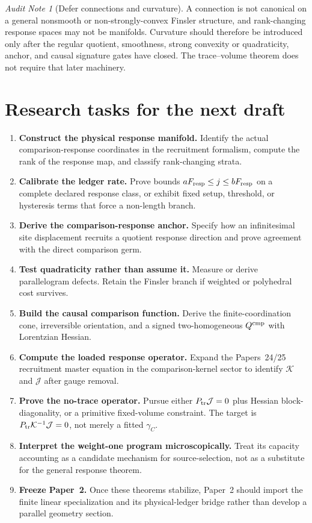 \documentclass[11pt]{article}
\theoremstyle{remark}
\newtheorem{audit}[theorem]{Audit Note}
\newcommand{\Fresp}{F_{\rm resp}}
\newcommand{\Qcmp}{Q^{\rm cmp}}
\newcommand{\Ptr}{P_{\rm tr}}
\begin{document}
\begin{audit}[Defer connections and curvature]
A connection is not canonical on a general nonsmooth or non-strongly-convex Finsler structure, and rank-changing response spaces may not be manifolds.  Curvature should therefore be introduced only after the regular quotient, smoothness, strong convexity or quadraticity, anchor, and causal signature gates have closed.  The trace--volume theorem does not require that later machinery.
\end{audit}

\section{Research tasks for the next draft}

\begin{enumerate}
\item \textbf{Construct the physical response manifold.}  Identify the actual comparison-response coordinates in the recruitment formalism, compute the rank of the response map, and classify rank-changing strata.
\item \textbf{Calibrate the ledger rate.}  Prove bounds $a\Fresp\le j\le b\Fresp$ on a complete declared response class, or exhibit fixed setup, threshold, or hysteresis terms that force a non-length branch.
\item \textbf{Derive the comparison-response anchor.}  Specify how an infinitesimal site displacement recruits a quotient response direction and prove agreement with the direct comparison germ.
\item \textbf{Test quadraticity rather than assume it.}  Measure or derive parallelogram defects.  Retain the Finsler branch if weighted or polyhedral cost survives.
\item \textbf{Build the causal comparison function.}  Derive the finite-coordination cone, irreversible orientation, and a signed two-homogeneous $\Qcmp$ with Lorentzian Hessian.
\item \textbf{Compute the loaded response operator.}  Expand the Papers~24/25 recruitment master equation in the comparison-kernel sector to identify $\mathcal K$ and $\mathcal J$ after gauge removal.
\item \textbf{Prove the no-trace operator.}  Pursue either $\Ptr\mathcal J=0$ plus Hessian block-diagonality, or a primitive fixed-volume constraint.  The target is $\Ptr\mathcal K^{-1}\mathcal J=0$, not merely a fitted $\gamma_C$.
\item \textbf{Interpret the weight-one program microscopically.}  Treat its capacity accounting as a candidate mechanism for source-selection, not as a substitute for the general response theorem.
\item \textbf{Freeze Paper~2.}  Once these theorems stabilize, Paper~2 should import the finite linear specialization and its physical-ledger bridge rather than develop a parallel geometry section.
\end{enumerate}
\end{document}

